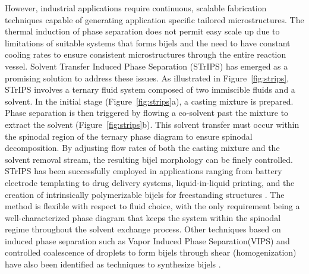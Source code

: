 However, industrial applications require continuous, scalable fabrication techniques capable of generating application specific tailored microstructures. The thermal induction of phase separation
does not permit easy scale up due to limitations of suitable systems that forms bijels and the need to have constant cooling rates to ensure consistent microstructures through the entire reaction
vessel. Solvent Transfer Induced Phase Separation (STrIPS) has emerged as a promising solution to address these issues.
As illustrated in Figure~\ref{fig:strips}, STrIPS involves a ternary fluid system composed of two immiscible fluids 
and a solvent. In the initial stage (Figure~\ref{fig:strips}a), a casting mixture is prepared. Phase separation is then triggered by flowing a co-solvent past the mixture to extract the solvent 
(Figure~\ref{fig:strips}b). This solvent transfer must occur within the spinodal region of the ternary phase diagram to ensure spinodal decomposition. By adjusting flow rates of both the casting 
mixture and the solvent removal stream, the resulting bijel morphology can be finely controlled. STrIPS has been successfully employed in applications ranging from battery electrode templating to drug 
delivery systems, liquid-in-liquid printing, and the creation of intrinsically polymerizable bijels for freestanding structures 
\cite{garcia_scalable_2019, thorson_bijel-templated_2019, amirfattahi_fabrication_2024, ching_rapid_2021}. The method is flexible with respect to fluid choice, with 
the only requirement being a well-characterized phase diagram that keeps the system within the spinodal regime throughout the solvent exchange process. Other techniques based on
induced phase separation such as Vapor Induced Phase Separation(VIPS) and controlled coalescence of droplets to form bijels through shear (homogenization) have also been identified as techniques
to synthesize bijels \cite{wang_scalable_2020, huang_bicontinuous_2017, cai_bijels_2017}.

